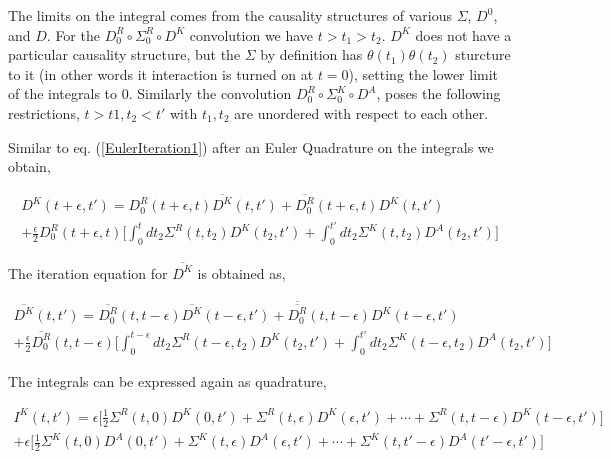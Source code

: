 \documentclass{amsart}
\begin{document}
     The limits on the integral comes from the causality structures of various $\Sigma$, $D^0$, and $D$. For the $D_0^R\circ \Sigma_0^R\circ D^K$ convolution we have $t>t_1>t_2$. $D^K$ does not have a particular causality structure, but the $\Sigma$ by definition has $\theta(t_1)\theta(t_2)$ sturcture to it (in other words it interaction is turned on at $t=0$), setting the lower limit of the integrals to 0. Similarly the convolution $D_0^R\circ \Sigma_0^K\circ D^A$, poses the following restrictions, $t>t1 , t_2<t'$ with $t_1,t_2$ are unordered with respect to each other.
    
     Similar to eq. (\ref{EulerIteration1}) after an Euler Quadrature on the integrals we obtain,
    
    \begin{multline}\label{KeldyshEulerIteration1}
         D^K(t+\epsilon , t') = D^R_0(t+\epsilon , t)\overline{D^K}(t , t')+\overline{D^R_0}(t+\epsilon , t)D^K(t , t')
        \\  + \frac{\epsilon}{2} D_0^R(t+\epsilon, t)\Big[\int^{t}_{0} dt_2 \Sigma^R (t,t_2) D^K(t_2, t') + \int^{t'}_{0} dt_2 \Sigma^K (t,t_2) D^A(t_2, t')\Big]
    \end{multline}
    
     The iteration equation for $\overline{D^K}$ is obtained as,
    
    
    \begin{multline}\label{KeldyshEulerIteration2}
         \overline{D^K}(t , t') = \overline{D^R_0}(t , t-\epsilon)\overline{D^K}(t-\epsilon , t')+\overline{\overline{D^R_0}}(t , t-\epsilon)D^K(t-\epsilon , t')
        \\  + \frac{\epsilon}{2} \overline{D_0^R}(t, t-\epsilon)\Big[\int^{t-\epsilon}_{0} dt_2 \Sigma^R (t-\epsilon,t_2) D^K(t_2, t') + \int^{t'}_{0} dt_2 \Sigma^K (t-\epsilon,t_2) D^A(t_2, t')\Big]
    \end{multline}
    
     The integrals can be expressed again as quadrature,
    
    \begin{multline}\label{KeldyshEulerIteration3}
         I^K(t,t')= \epsilon\Big[\frac{1}{2}\Sigma^R (t,0) D^K(0, t')+\Sigma^R (t,\epsilon) D^K(\epsilon, t')+\cdots+\Sigma^R (t,t-\epsilon) D^K(t-\epsilon, t')\Big] 
        \\ +\epsilon\Big[\frac{1}{2}\Sigma^K (t,0) D^A(0, t')+\Sigma^K (t,\epsilon) D^A(\epsilon, t')+\cdots+\Sigma^K (t,t'-\epsilon) D^A(t'-\epsilon, t')\Big]
    \end{multline}
    
\end{document}
